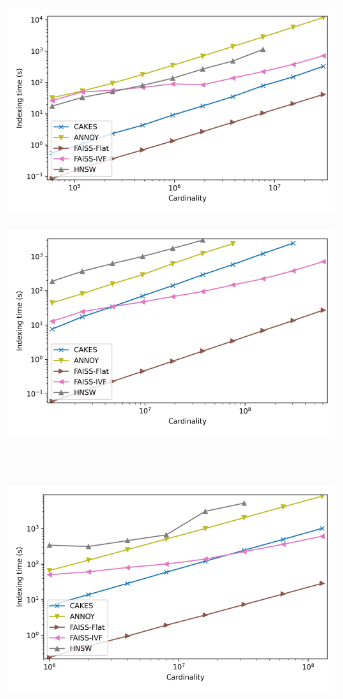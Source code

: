 \begin{figure}
    \begin{subfigure}[b]{0.47\textwidth}
        \includegraphics[width=0.95\textwidth]{plots/fashion-mnist-indexing.png}\\
        \label{fig:results:fashion-mnist-indexing}
    \end{subfigure}%
    \begin{subfigure}[b]{0.47\textwidth}
        \includegraphics[width=0.95\textwidth]{plots/glove-25-indexing.png}\\
        \label{fig:results:glove-25-indexing}
    \end{subfigure}
    \vspace{1em}
    \\
    \begin{subfigure}[b]{0.47\textwidth}
        \includegraphics[width=0.95\textwidth]{plots/sift-indexing.png}\\

\end{subfigure}
\end{figure}
